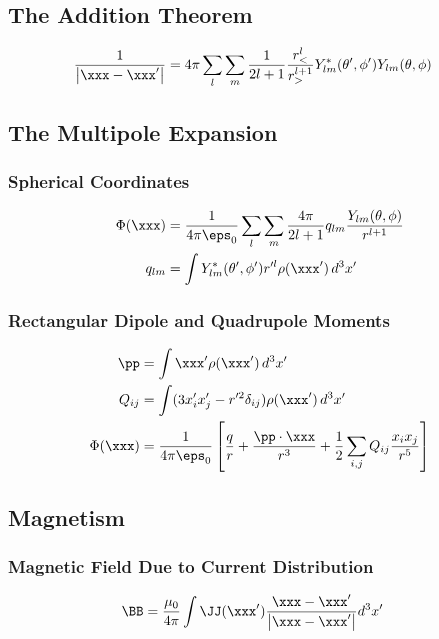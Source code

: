 \documentclass[11pt]{article}
\begin{document}
\subsection{The Addition Theorem}
\label{sec:org576bded}
\begin{align*}
\frac{1}{\left| \xxx - \xxx' \right|} & = 4\pi \sum_l \sum_m \frac{1}{2l+1} \frac{r_<^l}{r_>^{l+1}} Y_{lm}^*(\theta', \phi') Y_{lm}(\theta, \phi)
\end{align*}
\subsection{The Multipole Expansion}
\label{sec:orgf3ec7c4}
\subsubsection{Spherical Coordinates}
\label{sec:orga61f4e8}
\begin{align*}
\Phi(\xxx) & = \frac{1}{4\pi \eps_0} \sum_l \sum_m \frac{4\pi}{2l+1} q_{lm} \frac{Y_{lm}(\theta, \phi)}{r^{l+1}} \\
q_{lm} & = \int Y_{lm}^*(\theta', \phi') r^{\prime l} \rho(\xxx') \, d^3 x'
\end{align*}
\subsubsection{Rectangular Dipole and Quadrupole Moments}
\label{sec:org91c2fc3}
\begin{align*}
\pp & = \int \xxx' \rho(\xxx') \, d^3 x' \\
Q_{ij} & = \int (3x_i' x_j' - r^{\prime 2} \delta_{ij}) \rho(\xxx') \, d^3 x' \\
\Phi(\xxx) & = \frac{1}{4\pi \eps_0} \left[ \frac{q}{r} + \frac{\pp \cdot \xxx}{r^3}
+ \frac{1}{2} \sum_{i,j} Q_{ij} \frac{x_i x_j}{r^5} \right]
\end{align*}
\subsection{Magnetism}
\label{sec:orgb52da8b}
\subsubsection{Magnetic Field Due to Current Distribution}
\label{sec:orga730855}
\begin{align*}
\BB & = \frac{\mu_0}{4\pi} \int \JJ(\xxx') \frac{\xxx - \xxx'}{\left| \xxx - \xxx' \right|} d^3 x'
\end{align*}
\end{document}
